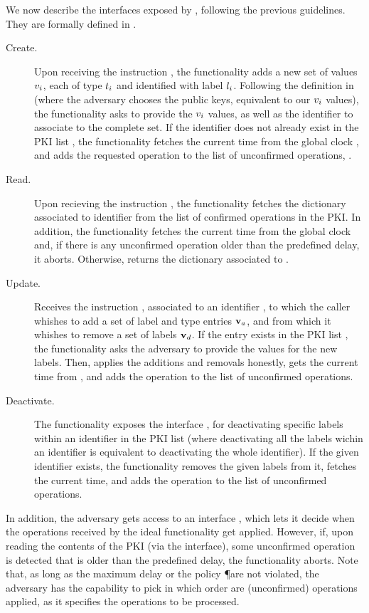 We now describe the interfaces exposed by \IdealGPKIDID, following the previous
guidelines. They are formally defined in .

\begin{description}
\item[Create.] Upon receiving the instruction , the functionality
  adds a new set of values $v_i$, each of type $t_i$ and identified with
  label $l_i$. Following the definition in \cite{canetti03} (where the
  adversary chooses the public keys, equivalent to our $v_i$ values), the
  functionality asks \Sim to provide the $v_i$ values, as well as the
  identifier to associate to the complete set. If the identifier does not
  already exist in the PKI list \VDRL, the functionality fetches the
  current time from the global clock \IdealGclock, and adds the requested
  operation to the list of unconfirmed operations, \VDROP.
\item[Read.] Upon recieving the instruction , the functionality
  fetches the dictionary associated to identifier \VDRid from the list of
  confirmed operations in the PKI. In addition, the functionality fetches the
  current time from the global clock \IdealGclock and, if there is any
  unconfirmed operation older than the predefined delay, it aborts. Otherwise,
  returns the dictionary associated to \VDRid.
\item[Update.] Receives the instruction , associated to an
  identifier \VDRid, to which the caller whishes to add a set of label and type
  entries $\mathbf{v}_a$, and from which it whishes to remove a set of labels
  $\mathbf{v}_d$. If the entry \VDRid exists in the PKI list \VDRL, the functionality
  asks the adversary to provide the values for the new labels. Then, applies the
  additions and removals honestly, gets the current time from \IdealGclock, and
  adds the operation to the list of unconfirmed operations.
\item[Deactivate.] The functionality exposes the interface , for
  deactivating specific labels within an identifier in the PKI list \VDRL (where
  deactivating all the labels wichin an identifier is equivalent to deactivating
  the whole identifier). If the given identifier exists, the functionality
  removes the given labels from it, fetches the current time, and adds the
  operation to the list of unconfirmed operations.
\end{description}

In addition, the adversary \Sim gets access to an interface ,
which lets it decide when the operations received by the ideal functionality
get applied. However, if, upon reading the contents of the PKI (via the
 interface), some unconfirmed operation is detected that is older
than the predefined delay, the functionality aborts. Note that, as long as the
maximum delay or the policy \P are not violated, the adversary has the
capability to pick in which order are (unconfirmed) operations applied, as it
specifies the operations to be processed.

